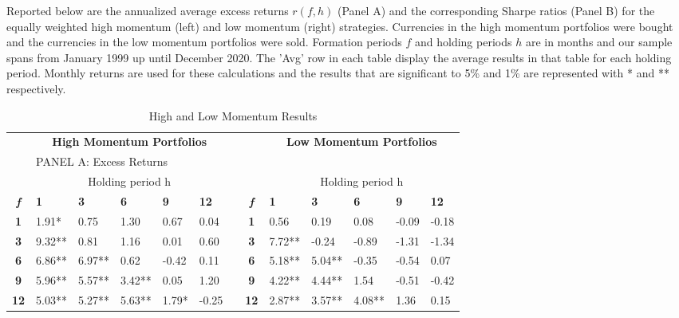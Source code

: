 \documentclass{article}
\begin{document}
\begin{table}[t!]
  \centering
  \caption{High and Low Momentum Results} Reported below are the annualized average excess returns $r(f,h)$ (Panel A) and the corresponding Sharpe ratios (Panel B) for the equally weighted high momentum (left) and low momentum (right) strategies. Currencies in the high momentum portfolios were bought and the currencies in the low momentum portfolios were sold. Formation periods $f$ and holding periods $h$ are in months and our sample spans from January 1999 up until December 2020. The 'Avg' row in each table display the average results in that table for each holding period. Monthly returns are used for these calculations and the results that are significant to 5\% and 1\% are represented with * and ** respectively.
    \begin{adjustwidth}{-1cm}{}
    \begin{tabular}{clllllrclllll}
          &       &       &       &       &       &       &       &       &       &       &       &  \\
    \midrule
          & \multicolumn{5}{c}{\textbf{High Momentum Portfolios }} &       &       & \multicolumn{5}{c}{\textbf{Low Momentum Portfolios }} \\
    \midrule
          & \multicolumn{12}{l}{PANEL A: Excess Returns} \\
    \midrule
          & \multicolumn{5}{c}{Holding period h}  &       &       & \multicolumn{5}{c}{Holding period h} \\
    \textit{\textbf{f}} & \textbf{1} & \textbf{3} & \textbf{6} & \textbf{9} & \textbf{12} &       & \textit{\textbf{f}} & \textbf{1} & \textbf{3} & \textbf{6} & \textbf{9} & \textbf{12} \\
\cmidrule{2-6}\cmidrule{9-13}    \textbf{1} & 1.91* & 0.75  & 1.30  & 0.67  & 0.04  &       & \textbf{1} & 0.56  & 0.19  & 0.08  & -0.09 & -0.18 \\
    \textbf{3} & 9.32** & 0.81  & 1.16  & 0.01  & 0.60  &       & \textbf{3} & 7.72** & -0.24 & -0.89 & -1.31 & -1.34 \\
    \textbf{6} & 6.86** & 6.97** & 0.62  & -0.42 & 0.11  &       & \textbf{6} & 5.18** & 5.04** & -0.35 & -0.54 & 0.07 \\
    \textbf{9} & 5.96** & 5.57** & 3.42** & 0.05  & 1.20  &       & \textbf{9} & 4.22** & 4.44** & 1.54  & -0.51 & -0.42 \\
    \textbf{12} & 5.03** & 5.27** & 5.63** & 1.79* & -0.25 &       & \textbf{12} & 2.87** & 3.57** & 4.08** & 1.36  & 0.15 \\

\end{tabular}
\end{adjustwidth}
\end{table}
\end{document}
